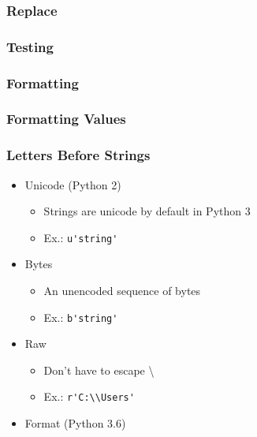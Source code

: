 \documentclass{beamer}
\begin{document}
%
%
\begin{frame}
  \frametitle{Replace}
\end{frame}


%
%
\begin{frame}
  \frametitle{Testing}
\end{frame}


%
%
%
\begin{frame}
  \frametitle{Formatting}
\end{frame}

%
%
\begin{frame}
  \frametitle{Formatting Values} 
\end{frame}


%
%
\begin{frame}
  \frametitle{Letters Before Strings}
  \begin{itemize}
    \item Unicode (Python 2)
      \begin{itemize}
        \item Strings are unicode by default in Python 3
        \item Ex.: \lstinline{u'string'}
      \end{itemize}

    \item Bytes
      \begin{itemize}
        \item An unencoded sequence of bytes
        \item Ex.: \lstinline{b'string'}
      \end{itemize}

    \item Raw
      \begin{itemize}
	\item Don't have to escape \textbackslash
        \item Ex.: \lstinline{r'C:\\Users'}
      \end{itemize}

    \item Format (Python 3.6) 
    \end{itemize}
  \end{frame}
\end{document}
